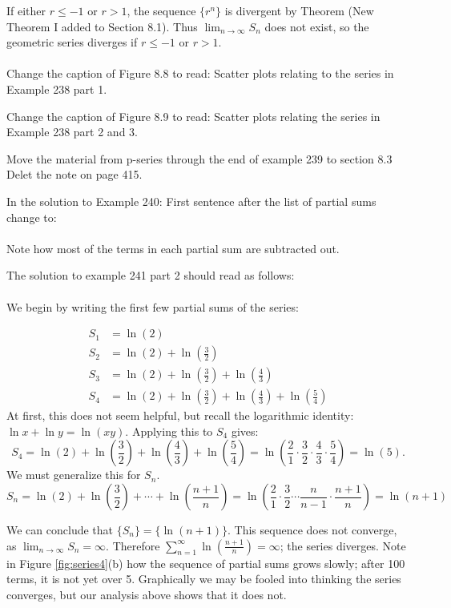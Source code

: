 \documentclass[10pt]{article}
\newcommand{\ds}{\displaystyle}
\begin{document}
If either $r\leq -1$ or $r>1$, the sequence $\{r^n\}$ is divergent by Theorem {(New Theorem I added to Section 8.1)}. Thus $\ds \lim_{n\to \infty} S_n$ does not exist, so the geometric series diverges if $r\leq -1$ or $r>1$.  \\ \\

Change the caption of Figure 8.8 to read:      Scatter plots relating to the series in Example 238 part 1.

Change the caption of Figure 8.9 to read:     Scatter plots relating the series in Example 238 part 2 and 3.


Move the material from p-series through the end of example 239 to section 8.3    %
 	Delet the note on page 415.


In the solution to Example 240:  First sentence after the list of partial sums change to: \\ \\

		Note how most of the terms in each partial sum are subtracted out.


The solution to example 241 part 2 should read as follows: \\ \\

We begin by writing the first few partial sums of the series:

\begin{align*}
S_1 &= \ln\left(2\right) \\
S_2 &= \ln\left(2\right)+\ln\left(\frac32\right) \\
S_3 &= \ln\left(2\right)+\ln\left(\frac32\right)+\ln\left(\frac43\right) \\
S_4 &= \ln\left(2\right)+\ln\left(\frac32\right)+\ln\left(\frac43\right)+\ln\left(\frac54\right) 
\end{align*}
At first, this does not seem helpful, but recall the logarithmic identity: $\ln x+\ln y = \ln (xy).$ Applying this to $S_4$ gives:
$$S_4 = \ln\left(2\right)+\ln\left(\frac32\right)+\ln\left(\frac43\right)+\ln\left(\frac54\right) = \ln\left(\frac21\cdot\frac32\cdot\frac43\cdot\frac54\right) = \ln\left(5\right).$$
We must generalize this for $S_n$.
$$S_n=\ln\left(2\right)+\ln\left(\frac32\right)+\cdots +\ln \left(\frac{n+1}{n}\right)=\ln\left(\frac21\cdot\frac32 \cdots  \frac{n}{n-1}\cdot \frac{n+1}{n}\right)=\ln ( n+1)$$

We can conclude that $\{S_n\} = \big\{\ln (n+1)\big\}$. This sequence  does not converge, as $\ds \lim_{n\to\infty}S_n=\infty$. Therefore  $\ds\sum_{n=1}^\infty  \ln\left(\frac{n+1}{n}\right)=\infty$; the series diverges. Note in Figure \ref{fig:series4}(b) how the sequence of partial sums grows slowly; after 100 terms, it is not yet over 5. Graphically we may be fooled into thinking the series converges, but our analysis above shows that it does not.     \\ \\
\end{document}
